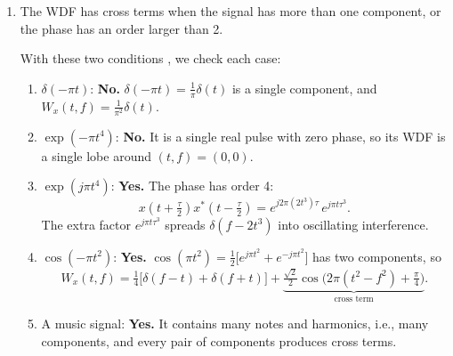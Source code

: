 \documentclass[12pt,a4paper]{article}
\begin{document}
\begin{enumerate}
\item The WDF has cross terms when the signal has more than one component, or the phase has an order larger than 2.

With these two conditions , we check each case:
\begin{enumerate}[label=(\alph*)]
  \item $\delta(-\pi t)$: \textbf{No.} $\delta(-\pi t)=\frac1\pi\delta(t)$ is a single component, and $W_x(t,f)=\frac{1}{\pi^2}\delta(t)$.

  \item $\exp(-\pi t^4)$: \textbf{No.} It is a single real pulse with zero phase, so its WDF is a single lobe around $(t,f)=(0,0)$.

  \item $\exp(j\pi t^4)$: \textbf{Yes.} The phase has order 4:
  \[
  x(t+\tfrac\tau2)x^*(t-\tfrac\tau2)=e^{j2\pi(2t^3)\tau}\,e^{j\pi t\tau^3}.
  \]
  The extra factor $e^{j\pi t\tau^3}$ spreads $\delta(f-2t^3)$ into oscillating interference.

  \item $\cos(-\pi t^2)$: \textbf{Yes.} $\cos(\pi t^2)=\frac12\big[e^{j\pi t^2}+e^{-j\pi t^2}\big]$ has two components, so
  \[
  W_x(t,f)=\tfrac14\big[\delta(f-t)+\delta(f+t)\big]+\underbrace{\tfrac{\sqrt2}{2}\cos\!\big(2\pi(t^2-f^2)+\tfrac\pi4\big)}_{\text{cross term}}.
  \]

  \item A music signal: \textbf{Yes.} It contains many notes and harmonics, i.e., many components, and every pair of components produces cross terms.
\end{enumerate}


\end{enumerate}
\end{document}

